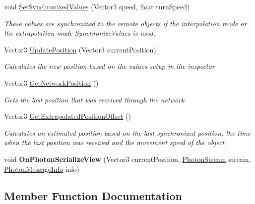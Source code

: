 \begin{DoxyCompactItemize}
\item 
void \hyperlink{class_photon_transform_view_position_control_af8893b17871604614de5d5f80721d0e9}{Set\+Synchronized\+Values} (Vector3 speed, float turn\+Speed)
\begin{DoxyCompactList}\small\item\em These values are synchronized to the remote objects if the interpolation mode or the extrapolation mode Synchronize\+Values is used. \end{DoxyCompactList}\item 
Vector3 \hyperlink{class_photon_transform_view_position_control_aea906d59f0637f9a1ee8a8c6504ad217}{Update\+Position} (Vector3 current\+Position)
\begin{DoxyCompactList}\small\item\em Calculates the new position based on the values setup in the inspector \end{DoxyCompactList}\item 
Vector3 \hyperlink{class_photon_transform_view_position_control_a7c378517491ed0878fa78f8834fa5c0b}{Get\+Network\+Position} ()
\begin{DoxyCompactList}\small\item\em Gets the last position that was received through the network \end{DoxyCompactList}\item 
Vector3 \hyperlink{class_photon_transform_view_position_control_a995fea08fe2aa2ad1c004513c5ba7d65}{Get\+Extrapolated\+Position\+Offset} ()
\begin{DoxyCompactList}\small\item\em Calculates an estimated position based on the last synchronized position, the time when the last position was received and the movement speed of the object \end{DoxyCompactList}\item 
void {\bfseries On\+Photon\+Serialize\+View} (Vector3 current\+Position, \hyperlink{class_photon_stream}{Photon\+Stream} stream, \hyperlink{class_photon_message_info}{Photon\+Message\+Info} info)\hypertarget{class_photon_transform_view_position_control_ac7cc0066925dc4ccf46f2a1ae8a7216f}{}\label{class_photon_transform_view_position_control_ac7cc0066925dc4ccf46f2a1ae8a7216f}

\end{DoxyCompactItemize}


\subsection{Member Function Documentation}
